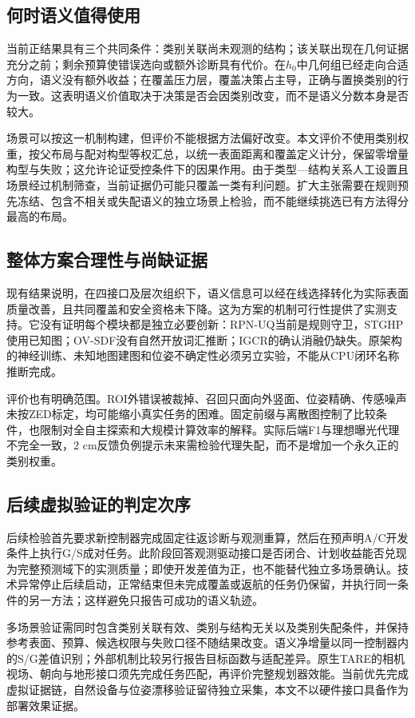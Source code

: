 \documentclass[11pt,a4paper]{article}
\begin{document}
\subsection{何时语义值得使用}
当前正结果具有三个共同条件：类别关联尚未观测的结构；该关联出现在几何证据充分之前；剩余预算使错误选向或额外诊断具有代价。在$h_0$中几何组已经走向合适方向，语义没有额外收益；在覆盖压力层，覆盖决策占主导，正确与置换类别的行为一致。这表明语义价值取决于决策是否会因类别改变，而不是语义分数本身是否较大。

场景可以按这一机制构建，但评价不能根据方法偏好改变。本文评价不使用类别权重，按父布局与配对构型等权汇总，以统一表面距离和覆盖定义计分，保留零增量构型与失败；这允许论证受控条件下的因果作用。由于类型—结构关系人工设置且场景经过机制筛查，当前证据仍可能只覆盖一类有利问题。扩大主张需要在规则预先冻结、包含不相关或失配语义的独立场景上检验，而不能继续挑选已有方法得分最高的布局。

\subsection{整体方案合理性与尚缺证据}
现有结果说明，在四接口及层次组织下，语义信息可以经在线选择转化为实际表面质量改善，且共同覆盖和安全资格未下降。这为方案的机制可行性提供了实测支持。它没有证明每个模块都是独立必要创新：RPN-UQ当前是规则守卫，STGHP使用已知图；OV-SDF没有自然开放词汇推断；IGCR的确认消融仍缺失。原架构的神经训练、未知地图建图和位姿不确定性必须另立实验，不能从CPU闭环名称推断完成。

评价也有明确范围。ROI外错误被裁掉、召回只面向外竖面、位姿精确、传感噪声未按ZED标定，均可能缩小真实任务的困难。固定前缀与离散图控制了比较条件，也限制对全自主探索和大规模计算效率的解释。实际后端F1与理想曝光代理不完全一致，2 cm反馈负例提示未来需检验代理失配，而不是增加一个永久正的类别权重。

\subsection{后续虚拟验证的判定次序}
后续检验首先要求新控制器完成固定往返诊断与观测重算，然后在预声明A/C开发条件上执行G/S成对任务。此阶段回答观测驱动接口是否闭合、计划收益能否兑现为完整预测域下的实测质量；即使开发差值为正，也不能替代独立多场景确认。技术异常停止后续启动，正常结束但未完成覆盖或返航的任务仍保留，并执行同一条件的另一方法；这样避免只报告可成功的语义轨迹。

多场景验证需同时包含类别关联有效、类别与结构无关以及类别失配条件，并保持参考表面、预算、候选权限与失败口径不随结果改变。语义净增量以同一控制器内的S/G差值识别；外部机制比较另行报告目标函数与适配差异。原生TARE的相机视场、朝向与地形接口须先完成任务匹配，再评价完整规划器效能。当前优先完成虚拟证据链，自然设备与位姿漂移验证留待独立采集，本文不以硬件接口具备作为部署效果证据。
\end{document}
